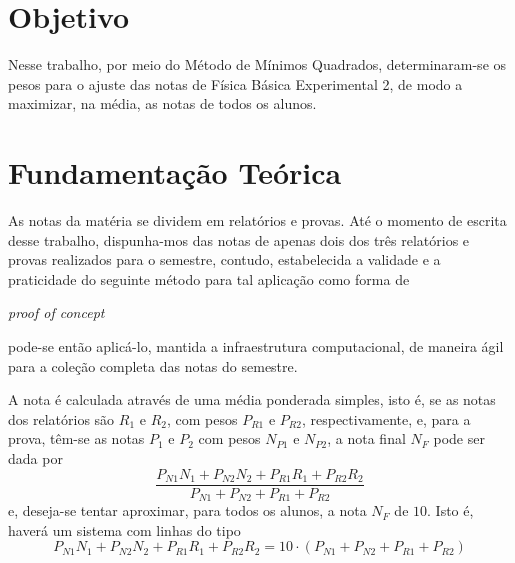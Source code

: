 \documentclass[11pt, twocolumn]{article}
\title{\vartitulo}
\author
{
        \varautor \\
        \varinstituicao \\
        \vardepartamento \\
        \varcontato
}
\date{}
\begin{document}



        \section{Objetivo}
		Nesse trabalho, por meio do Método de Mínimos
		Quadrados, determinaram-se os pesos para o 
		ajuste das notas de Física Básica Experimental 
		2, de modo a maximizar, na média, as notas de 
		todos os alunos.

        \section{Fundamentação Teórica}
		As notas da matéria se dividem em relatórios e 
		provas. Até o momento de escrita desse trabalho,
		dispunha-mos das notas de apenas dois dos três 
		relatórios e provas realizados para o semestre,
		contudo, estabelecida a validade e a praticidade
		do seguinte método para tal aplicação como 
		forma de 
		\begin{otherlanguage}{english}
			\textit{proof of concept}
		\end{otherlanguage}
		pode-se então aplicá-lo, mantida a 
		infraestrutura computacional, de maneira ágil 
		para a coleção completa das notas do semestre.

		A nota é calculada através de uma média 
		ponderada simples, isto é, se as notas dos 
		relatórios são $R_1$ e $R_2$, com pesos 
		$P_{R1}$ e $P_{R2}$, respectivamente, e, para 
		a prova, têm-se as notas $P_1$ e $P_2$
		com pesos $N_{P1}$ e $N_{P2}$, a nota final 
		$N_F$ pode ser dada por
                \begin{equation}
			\frac{P_{N1}N_1 + P_{N2}N_2 + 
			      P_{R1}R_1 + P_{R2}R_2}
			     {P_{N1} + P_{N2} + P_{R1} + P_{R2}} 
                \end{equation}
		e, deseja-se tentar aproximar, para todos os 
		alunos, a nota $N_F$ de $10$. Isto é, haverá 
		um sistema com linhas do tipo 
                \begin{equation}
			P_{N1}N_1 + P_{N2}N_2 + 
			P_{R1}R_1 + P_{R2}R_2
			= 10 \cdot
			\left(
			P_{N1} + P_{N2} + P_{R1} + P_{R2} 
			\right)
                \end{equation}
		
\end{document}

